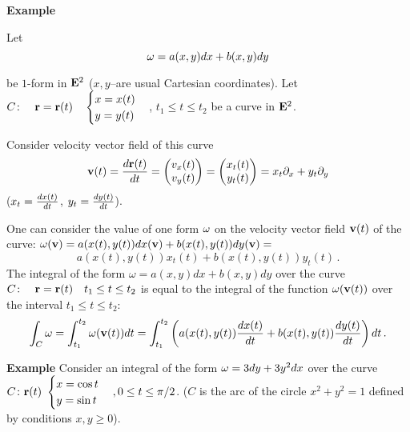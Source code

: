 \documentclass[12pt]{article}
\numberwithin{equation}{section}
\begin{document}
\m
{\bf Example}


Let
         $$
       {\omega}=a(x,y)dx+b(x,y)dy
         $$

be $1$-form in ${\bf E}^2$ ($x,y$--are usual Cartesian coordinates).
Let
$C\colon\quad {\bf r}={\bf r}(t)\quad\begin{cases}x=x(t)\cr y=y(t)\cr \end{cases}$,
 $t_1\leq t\leq t_2$ be a curve in ${\bf E}^2$.



  Consider velocity vector field of this curve
\begin{equation}\label{velocityvector}
  {\bf v}(t)={d{\bf r}(t)\over dt}=\begin{pmatrix}v_x(t)\cr v_y(t)\cr \end{pmatrix}=
   \begin{pmatrix}x_t(t)\cr y_t(t)\cr
    \end{pmatrix}=x_t\partial_x+y_t\partial_y
 \end{equation}
($x_t={dx(t)\over dt}$, $y_t={dy(t)\over dt}$).

  One can consider the value of one form ${\omega}$ on the velocity vector field ${\bf v}(t)$ of the curve:
  ${\omega}({\bf v})=a(x(t),y(t))dx({\bf v})+b(x(t),y(t))dy({\bf v})=$
             $$
      a(x(t),y(t))x_t(t)+b(x(t),y(t))y_t(t)\,.
             $$
The integral of the form $\omega=a(x,y)dx+b(x,y)dy$ over the curve
$C\colon\quad {\bf r}={\bf r}(t)\quad t_1\leq t\leq t_2$ is equal to the integral of the function ${\omega}({\bf v}(t))$
over the interval $t_1\leq t\leq t_2$:
              \begin{equation}\label{definitionofintegral}
    \int_C {\omega}=\int_{t_1}^{t_2}{\omega}({\bf v}(t))dt=
               \int_{t_1}^{t_2}
               \left(
    a(x(t),y(t)){dx(t)\over dt}+b(x(t),y(t)){dy(t)\over dt}
              \right)dt\,.
            \end{equation}
\m


{\bf Example} Consider an integral of the form ${\omega}=3dy+3y^2dx$ over the curve
$C\colon {\bf r}(t)\,\, \begin{cases}x=\cos t\\ y=\sin t \end{cases}, 0\leq t\leq \pi/2$.
($C$ is the arc of the circle $x^2+y^2=1$ defined by conditions $x,y\geq 0$).
\end{document}
